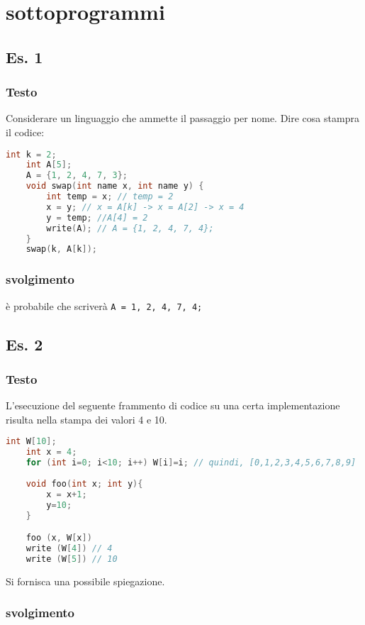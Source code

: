 \section{sottoprogrammi}

\subsection{Es. 1}
\subsubsection{Testo}

Considerare un linguaggio che ammette il passaggio per nome. Dire cosa stampra il codice:
\begin{lstlisting}[language=C]
    int k = 2;
    int A[5];
    A = {1, 2, 4, 7, 3};
    void swap(int name x, int name y) {
        int temp = x; // temp = 2
        x = y; // x = A[k] -> x = A[2] -> x = 4
        y = temp; //A[4] = 2
        write(A); // A = {1, 2, 4, 7, 4};
    }
    swap(k, A[k]); 
\end{lstlisting}

\subsubsection{svolgimento}

è probabile che scriverà \texttt{A = {1, 2, 4, 7, 4};
}
\subsection{Es. 2}
\subsubsection{Testo}

L'esecuzione del seguente frammento di codice su una certa implementazione risulta nella stampa dei valori 4 e 10.
\begin{lstlisting}[language=C]
    int W[10];
    int x = 4;
    for (int i=0; i<10; i++) W[i]=i; // quindi, [0,1,2,3,4,5,6,7,8,9]
    
    void foo(int x; int y){
        x = x+1;
        y=10;
    }

    foo (x, W[x])
    write (W[4]) // 4
    write (W[5]) // 10
\end{lstlisting}

Si fornisca una possibile spiegazione.


\subsubsection{svolgimento}

